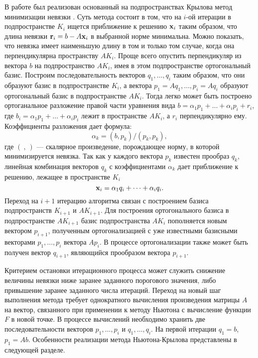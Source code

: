 \def\r{\mathbf{r}}
В работе был реализован основанный на подпространствах Крылова метод минимизации невязки \cite{EEbook}. Суть метода состоит в том, что на $i$-ой итерации в подпространстве $K_i$ ищется приближение к решению $\mathbf{x}_i$ таким образом, что длина невязки $\r_i = b - A\x_i$ в выбранной норме минимальна. Можно показать, что невязка имеет наименьшую длину в том и только том случае, когда она перпендикулярна пространству $AK_i$. Проще всего опустить перпендикуляр из вектора $b$ на подпространство $AK_i$, имея в этом подпространстве ортогональный базис. Построим последовательность векторов $q_1, \dots, q_i$ таким образом, что они образуют базис в подпространстве $K_i$, а вектора $p_1 = Aq_1, \dots, p_i = Aq_i$ образуют ортогональный базис в подпространстве $AK_i$. Тогда легко может быть построено ортоганальное разложение правой части уравнения вида $b = \alpha_1 p_1 + \dots + \alpha_i p_i + r_i$, где $b_i =  \alpha_1 p_1 + \dots + \alpha_i p_i$ лежит в пространстве $AK_i$, а $r_i$ перпендикулярно ему. Коэффициенты разложения дает формула:
\begin{equation}
\alpha_k = (b,p_k) / (p_k, p_k),
\end{equation}
где $(\ ,\ )$ ---  скалярное произведение, порождающее норму, в которой минимизируется невязка. 
Так как у каждого вектора $p_k$ известен прообраз $q_k$, линейная комбинация векторов $q_k$ с коэффициентами $\alpha_k$ дает приближение к решению, лежащее в пространстве $K_i$
\begin{equation}
\mathbf{x}_i = \alpha_1 q_i + \dots + \alpha_i q_i. 
\end{equation}
Переход на $i+1$ итерацию алгоритма связан с построением базиса подпространств $K_{i+1}$ и $AK_{i+1}$. Для построения ортогонального базиса в подпространстве $AK_{i+1}$ базис подпространства $AK_i$ пополняется новым вектором $p_{i+1}$, полученным ортогонализацией с уже известными базисными векторами $p_1, \dots, p_i$ вектора $Ap_i$. В процессе ортогонализации также может быть получен вектор $q_{i+1}$, являющийся прообразом вектора $p_{i+1}$. 

Критерием остановки итерационного процесса может служить снижение величины невязки ниже заранее заданного порогового значения, либо привышение заранее заданного числа итераций. Переход на новый шаг выполнения метода требует однократного вычисления произведения матрицы $A$ на вектор, связанного при применении к методу Ньютона с вычисление функции $F$ в новой точке. В процессе вычислений необходимо хранить две последовательности векторов $p_1, \dots, p_i$ и $q_1, \dots, q_i$. На первой итерации $q_1 = b$, $p_1 = Ab$. 
Особенности реализации метода Ньютона-Крылова представлены в следующей разделе.  



